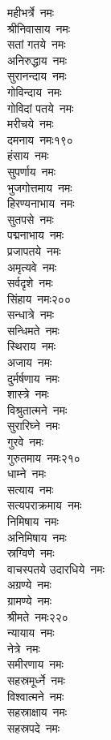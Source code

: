 \begin{multicols}{2}
\begin{flushleft}
महीभर्त्रे~नमः\\
श्रीनिवासाय~नमः\\
सतां गतये~नमः\\
अनिरुद्धाय~नमः\\
सुरानन्दाय~नमः\\
गोविन्दाय~नमः\\
गोविदां पतये~नमः\\
मरीचये~नमः\\
दमनाय~नमः\hfill १९०\\
हंसाय~नमः\\
सुपर्णाय~नमः\\
भुजगोत्तमाय~नमः\\
हिरण्यनाभाय~नमः\\
सुतपसे~नमः\\
पद्मनाभाय~नमः\\
प्रजापतये~नमः\\
अमृत्यवे~नमः\\
सर्वदृशे~नमः\\
सिंहाय~नमः\hfill २००\\
सन्धात्रे~नमः\\
सन्धिमते~नमः\\
स्थिराय~नमः\\
अजाय~नमः\\
दुर्मर्षणाय~नमः\\
शास्त्रे~नमः\\
विश्रुतात्मने~नमः\\
सुरारिघ्ने~नमः\\
गुरवे~नमः\\
गुरुतमाय~नमः\hfill २१०\\
धाम्ने~नमः\\
सत्याय~नमः\\
सत्यपराक्रमाय~नमः\\
निमिषाय~नमः\\
अनिमिषाय~नमः\\
स्रग्विणे~नमः\\
वाचस्पतये उदारधिये~नमः\\
अग्रण्ये~नमः\\
ग्रामण्ये~नमः\\
श्रीमते~नमः\hfill २२०\\
न्यायाय~नमः\\
नेत्रे~नमः\\
समीरणाय~नमः\\
सहस्रमूर्ध्ने~नमः\\
विश्वात्मने~नमः\\
सहस्राक्षाय~नमः\\
सहस्रपदे~नमः\\

\end{flushleft}
\end{multicols}
